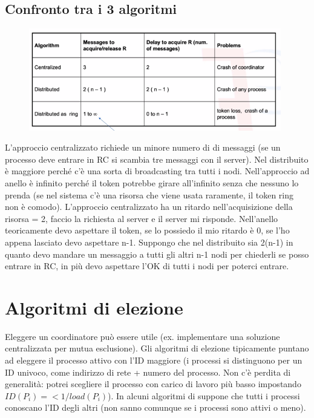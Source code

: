\documentclass[12pt,italian]{report}
\begin{document}
\subsection{Confronto tra i 3 algoritmi }
\begin{figure}[h]
\centering
\includegraphics[width=110mm]{img/confronto.png}
\end{figure}
 L'approccio centralizzato richiede un minore numero di di messaggi (se un processo deve entrare in RC si scambia tre messaggi con il server). Nel distribuito è maggiore perché c'è una sorta di broadcasting tra tutti i nodi. Nell'approccio ad anello è infinito perché il token potrebbe girare all'infinito senza che nessuno lo prenda (se nel sistema c'è una risorsa che viene usata raramente, il token ring non è comodo).
 \bigbreak
 L'approccio centralizzato ha un ritardo nell'acquisizione della risorsa = 2, faccio la richiesta al server e il server mi risponde. Nell'anello teoricamente devo aspettare il token, se lo possiedo il mio ritardo è 0, se l'ho appena lasciato devo aspettare n-1. Suppongo che nel distribuito sia 2(n-1) in quanto devo mandare un messaggio a tutti gli altri n-1 nodi per chiederli se posso entrare in RC, in più devo aspettare l'OK di tutti i nodi per poterci entrare. 

\section{Algoritmi di elezione}
Eleggere un coordinatore può essere utile (ex. implementare una soluzione centralizzata per mutua esclusione). Gli algoritmi di elezione tipicamente puntano ad eleggere il processo attivo con l'ID maggiore (i processi si distinguono per un ID univoco, come indirizzo di rete + numero del processo. Non c'è perdita di generalità: potrei scegliere il processo con carico di lavoro più basso impostando $ID(P_i) =< 1/load(P_i)$). In alcuni algoritmi di suppone che tutti i processi conoscano l'ID degli altri (non sanno comunque se i processi sono attivi o meno). 
\end{document}
